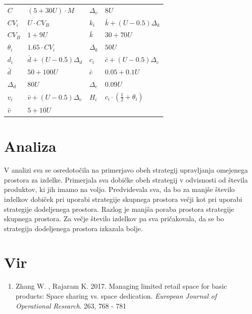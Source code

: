 \documentclass[a4paper]{article}
\begin{document}
\begin{tabular}{ l l | l l }
	\hline
  $C$ & $(5 + 30 U) \cdot M$ & $ \Delta_v $ & $8 U$\\
  $CV_i$ & $U \cdot CV_B$ & $k_i$ & $\bar{k} + (U - 0.5) \Delta_k$\\
  $CV_B$ & $1 + 9 U$ & $ \bar{k}$ & $30 + 70 U$\\
  $\theta_i$ & $ 1.65 \cdot CV_i$ & $ \Delta_k$ & $50 U$\\
  $d_i$ & $\bar{d} + (U - 0.5) \Delta_d$ & $ c_i$ & $\bar{c} + (U - 0.5) \Delta_c$\\
  $\bar{d}$ & $50 + 100 U$ & $\bar{c}$ & $ 0.05 + 0.1 U$\\
  $\Delta_d$ & $80 U$ & $\Delta_c$ & $0.09 U$\\
  $ v_i$ & $\bar{v} + (U - 0.5) \Delta_v$ & $H_i$ & $ c_i \cdot (\frac{1}{2} + \theta_i)$\\
  $ \bar{v}$ & $ 5 + 10 U$ & &\\
	\hline
\end{tabular}


\section{Analiza}

V analizi sva se osredotočila na primerjavo obeh strategij upravljanja omejenega prostora za izdelke. Primerjala sva dobičke obeh strategij v odvisnosti od števila produktov, ki jih imamo na voljo. Predvidevala sva, da bo za manjše število izdelkov dobiček pri uporabi strategije skupnega prostora večji kot pri uporabi strategije dodeljenega prostora. Razlog je manjša poraba prostora strategije skupnega prostora. Za večje število izdelkov pa sva pričakovala, da se bo strategija dodeljenega prostora izkazala bolje. 




\section{Vir}

\begin{enumerate}
\item Zhang W. , Rajaram K. 2017. Managing limited retail space for basic products: Space sharing vs. space dedication. \textit{European Journal of Operational Research}. 263, 768 - 781
\end{enumerate}
\end{document}
